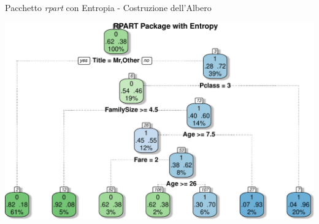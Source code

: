 \documentclass[9pt, xcolor=table]{beamer}
\begin{document}
	\begin{frame}{Pacchetto \textit{rpart} con Entropia - Costruzione dell'Albero}
		
		
		\vfill
		
		\centering
		\includegraphics[scale=0.46]{rpart-entropy-tree}
		
	\end{frame}
	
\end{document}

